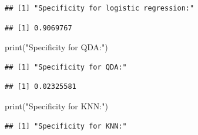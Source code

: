 \documentclass[
]{article}
\newenvironment{Shaded}{\begin{snugshade}}{\end{snugshade}}
\newcommand{\FunctionTok}[1]{\textcolor[rgb]{0.00,0.00,0.00}{#1}}
\newcommand{\NormalTok}[1]{#1}
\newcommand{\SpecialCharTok}[1]{\textcolor[rgb]{0.00,0.00,0.00}{#1}}
\newcommand{\StringTok}[1]{\textcolor[rgb]{0.31,0.60,0.02}{#1}}
\begin{document}
\begin{verbatim}
## [1] "Specificity for logistic regression:"
\end{verbatim}

\begin{Shaded}
\end{Shaded}

\begin{verbatim}
## [1] 0.9069767
\end{verbatim}

\begin{Shaded}
\begin{Highlighting}[]
\FunctionTok{print}\NormalTok{(}\StringTok{"Specificity for QDA:"}\NormalTok{)}
\end{Highlighting}
\end{Shaded}

\begin{verbatim}
## [1] "Specificity for QDA:"
\end{verbatim}

\begin{Shaded}
\end{Shaded}

\begin{verbatim}
## [1] 0.02325581
\end{verbatim}

\begin{Shaded}
\begin{Highlighting}[]
\FunctionTok{print}\NormalTok{(}\StringTok{"Specificity for KNN:"}\NormalTok{)}
\end{Highlighting}
\end{Shaded}

\begin{verbatim}
## [1] "Specificity for KNN:"
\end{verbatim}

\begin{Shaded}
\end{Shaded}
\end{document}
